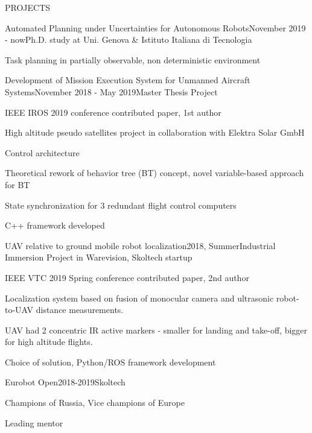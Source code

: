\documentclass{resume} %
\begin{document}
\begin{rSection}{PROJECTS}

\begin{rSubsection}{Automated Planning under Uncertainties for Autonomous Robots}{November 2019 - now}{Ph.D. study at Uni. Genova \& Istituto Italiana di Tecnologia}
\item Task planning in partially observable, non deterministic environment
\end{rSubsection}

\begin{rSubsection}{Development of Mission Execution System for Unmanned Aircraft Systems}{November 2018 - May 2019}{Master Thesis Project}{} 
\item IEEE IROS 2019 conference contributed paper, 1st author
\item High altitude pseudo satellites project in collaboration with Elektra Solar GmbH
\item Control architecture 
\item Theoretical rework of behavior tree (BT) concept, novel variable-based approach for BT
\item State synchronization for 3 redundant flight control computers
\item C++ framework developed

\end{rSubsection} 



\begin{rSubsection}{UAV relative to ground mobile robot localization}{2018, Summer}{Industrial Immersion Project in Warevision, Skoltech startup}{}
\item IEEE VTC 2019 Spring conference contributed paper, 2nd author
\item Localization system based on fusion of monocular camera and ultrasonic robot-to-UAV distance measurements.
\item UAV had 2 concentric IR active markers - smaller for landing and take-off, bigger for high altitude flights.
\item Choice of solution, Python/ROS framework development
\end{rSubsection}


\begin{rSubsection}{Eurobot Open}{2018-2019}{Skoltech}{}
\item Champions of Russia, Vice champions of Europe
\item Leading mentor
\end{rSubsection}


\end{rSection}
\end{document}
